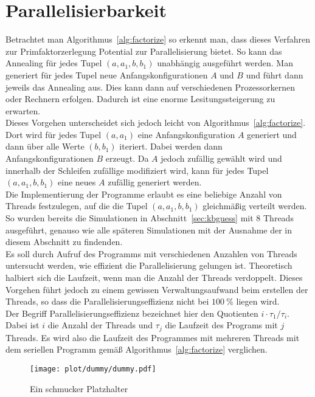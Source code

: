 \section{Parallelisierbarkeit}\label{sec:parallel}
Betrachtet man Algorithmus~\ref{alg:factorize} so erkennt man, dass dieses Verfahren zur Primfaktorzerlegung Potential zur Parallelisierung bietet. So kann das Annealing für jedes Tupel $\left(a,a_1,b,b_1\right)$ unabhängig ausgeführt werden. Man generiert für jedes Tupel neue Anfangskonfigurationen $A$ und $B$ und führt dann jeweils das Annealing aus. Dies kann dann auf verschiedenen Prozessorkernen oder Rechnern erfolgen. Dadurch ist eine enorme Lesitungssteigerung zu erwarten.\\
Dieses Vorgehen unterscheidet sich jedoch leicht von Algorithmus~\ref{alg:factorize}. Dort wird für jedes Tupel $\left(a,a_1\right)$ eine Anfangskonfiguration $A$ generiert und dann über alle Werte $\left(b,b_1\right)$ iteriert. Dabei werden dann Anfangskonfigurationen $B$ erzeugt. Da $A$ jedoch zufällig gewählt wird und innerhalb der Schleifen zufällige modifiziert wird, kann für jedes Tupel $\left(a,a_1,b,b_1\right)$ eine neues $A$ zufällig generiert werden. \\
Die Implementierung der Programme erlaubt es eine beliebige Anzahl von Threads festzulegen, auf die die Tupel $\left(a,a_1,b,b_1\right)$ gleichmäßig verteilt werden. So wurden bereits die Simulationen in Abschnitt~\ref{sec:kbguess} mit $8$ Threads ausgeführt, genauso wie alle späteren Simulationen mit der Ausnahme der in diesem Abschnitt zu findenden. \\
Es soll durch Aufruf des Programms  mit verschiedenen Anzahlen von Threads untersucht werden, wie effizient die Parallelisierung gelungen ist. Theoretisch halbiert sich die Laufzeit, wenn man die Anzahl der Threads verdoppelt. Dieses Vorgehen führt jedoch zu einem gewissen Verwaltungsaufwand beim erstellen der Threads, so dass die Parallelisierungseffizienz nicht bei $\SI{100}{\percent}$ liegen wird.\\
Der Begriff Parallelisierungseffizienz bezeichnet hier den Quotienten $i\cdot\tau_1/\tau_i$. Dabei ist $i$ die Anzahl der Threads und $\tau_j$ die Laufzeit des Programs mit $j$ Threads. Es wird also die Laufzeit des Programmes mit mehreren Threads mit dem seriellen Programm gemäß Algorithmus~\ref{alg:factorize} verglichen.
\begin{figure}[ht]
		\centering
		\texttt{[image: plot/dummy/dummy.pdf]}
		\caption{Ein schmucker Platzhalter}
\end{figure}

